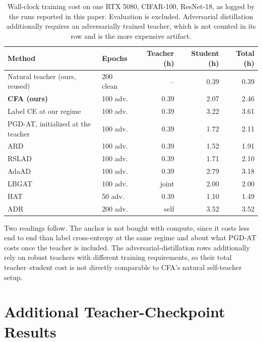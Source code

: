 \begin{table}[!htbp]
  \centering \small \setlength{\tabcolsep}{5pt}
  \caption{Wall-clock training cost on one RTX 5080, CIFAR-100, ResNet-18, as logged by the runs
  reported in this paper. Evaluation is excluded. Adversarial distillation additionally requires an
  adversarially trained teacher, which is not counted in its row and is the more expensive artifact.}
  \label{tab:compute}
  \begin{tabular}{llrrr}
    \toprule
    Method & Epochs & Teacher (h) & Student (h) & Total (h) \\
    \midrule
    Natural teacher (ours, reused) & 200 clean & --   & 0.39 & 0.39 \\
    \midrule
    \textbf{CFA (ours)}            & 100 adv.  & 0.39 & 2.07 & 2.46 \\
    Label CE at our regime         & 100 adv.  & 0.39 & 3.22 & 3.61 \\
    PGD-AT, initialized at the teacher & 100 adv. & 0.39 & 1.72 & 2.11 \\
    ARD                            & 100 adv.  & 0.39 & 1.52 & 1.91 \\
    RSLAD                          & 100 adv.  & 0.39 & 1.71 & 2.10 \\
    AdaAD                          & 100 adv.  & 0.39 & 2.79 & 3.18 \\
    LBGAT                          & 100 adv.  & joint & 2.00 & 2.00 \\
    HAT                            & 50 adv.   & 0.39 & 1.10 & 1.49 \\
    ADR                            & 200 adv.  & self  & 3.52 & 3.52 \\
    \bottomrule
  \end{tabular}
\end{table}

Two readings follow. The anchor is not bought with compute, since it costs less end to end than label
cross-entropy at the same regime and about what PGD-AT costs once the teacher is included. The adversarial-distillation rows additionally rely on robust teachers with different training
requirements, so their total teacher--student cost is not directly comparable to CFA's natural
self-teacher setup.

\section{Additional Teacher-Checkpoint Results}
\label{app:teachersel}

